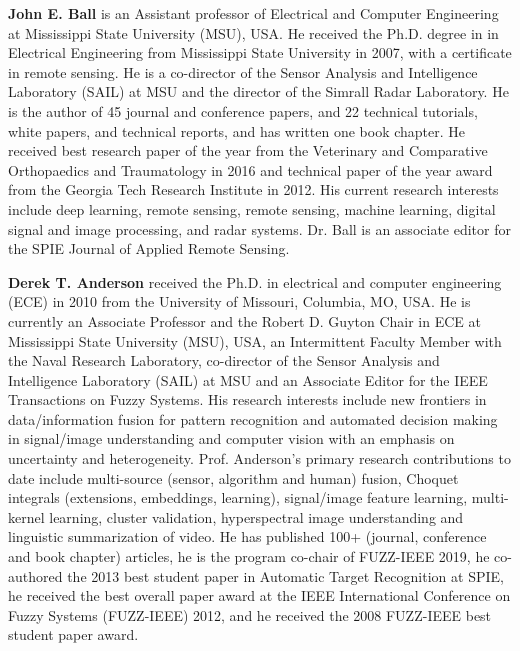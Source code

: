 \documentclass[12pt]{spieman}
\begin{document}
\begin{spacing}{1}
%
%
\vspace{2ex}\noindent\textbf{John E. Ball} is an Assistant professor of Electrical and Computer Engineering at Mississippi State University (MSU), USA. He received the Ph.D. degree in in Electrical Engineering from Mississippi State University in 2007, with a certificate in remote sensing. He is a co-director of the Sensor Analysis and Intelligence Laboratory (SAIL) at MSU and the director of the Simrall Radar Laboratory. He is the author of 45 journal and conference papers, and 22 technical tutorials, white papers, and technical reports, and has written one book chapter. He received best research paper of the year from the Veterinary and Comparative Orthopaedics and Traumatology in 2016 and technical paper of the year award from the Georgia Tech Research Institute in 2012. His current research interests include deep learning, remote sensing, remote sensing, machine learning, digital signal and image processing, and radar systems. Dr. Ball is an associate editor for the SPIE Journal of Applied Remote Sensing.

\vspace{1ex}
\vspace{2ex}\noindent\textbf{Derek T. Anderson} received the Ph.D. in electrical and computer engineering (ECE) in 2010 from the University of Missouri, Columbia, MO, USA. He is currently an Associate Professor and the Robert D. Guyton Chair in ECE at Mississippi State University (MSU), USA, an Intermittent Faculty Member with the Naval Research Laboratory, co-director of the Sensor Analysis and Intelligence Laboratory (SAIL) at MSU and an Associate Editor for the IEEE Transactions on Fuzzy Systems. His research interests include new frontiers in data/information fusion for pattern recognition and automated decision making in signal/image understanding and computer vision with an emphasis on uncertainty and heterogeneity. Prof. Anderson's primary research contributions to date include multi-source (sensor, algorithm and human) fusion, Choquet integrals (extensions, embeddings, learning), signal/image feature learning, multi-kernel learning, cluster validation, hyperspectral image understanding and linguistic summarization of video. He has published 100+ (journal, conference and book chapter) articles, he is the program co-chair of FUZZ-IEEE 2019, he co-authored the 2013 best student paper in Automatic Target Recognition at SPIE, he received the best overall paper award at the IEEE International Conference on Fuzzy Systems (FUZZ-IEEE) 2012, and he received the 2008 FUZZ-IEEE best student paper award.


\end{spacing}
\end{document}

